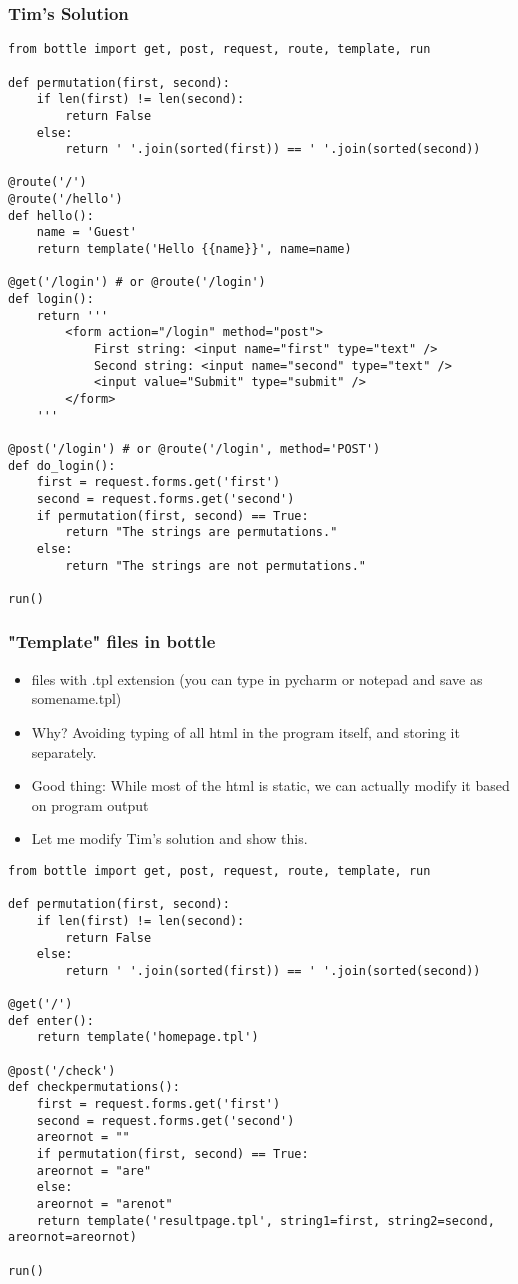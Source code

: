 \documentclass{beamer}
\begin{document}
\begin{frame}[fragile]
\frametitle{Tim's Solution}
\tiny
\begin{verbatim}
from bottle import get, post, request, route, template, run

def permutation(first, second):
    if len(first) != len(second):
        return False
    else:
        return ' '.join(sorted(first)) == ' '.join(sorted(second))

@route('/')
@route('/hello')
def hello():
    name = 'Guest'
    return template('Hello {{name}}', name=name)

@get('/login') # or @route('/login')
def login():
    return '''
        <form action="/login" method="post">
            First string: <input name="first" type="text" />
            Second string: <input name="second" type="text" />
            <input value="Submit" type="submit" />
        </form>
    '''

@post('/login') # or @route('/login', method='POST')
def do_login():
    first = request.forms.get('first')
    second = request.forms.get('second')
    if permutation(first, second) == True:
        return "The strings are permutations."
    else:
        return "The strings are not permutations."

run()
\end{verbatim}
\end{frame}

\begin{frame}[fragile]
\frametitle{"Template" files in bottle}
\begin{itemize}
\item files with .tpl extension (you can type in pycharm or notepad and save as somename.tpl)
\item Why? Avoiding typing of all html in the program itself, and storing it separately. 
\item Good thing: While most of the html is static, we can actually modify it based on program output
\item Let me modify Tim's solution and show this.
\end{itemize}
\end{frame}

\begin{frame}[fragile]
\scriptsize
\begin{verbatim}
from bottle import get, post, request, route, template, run

def permutation(first, second):
    if len(first) != len(second):
        return False
    else:
        return ' '.join(sorted(first)) == ' '.join(sorted(second))

@get('/')
def enter():
    return template('homepage.tpl')

@post('/check')
def checkpermutations():
    first = request.forms.get('first')
    second = request.forms.get('second')
    areornot = ""
    if permutation(first, second) == True:
	areornot = "are"
    else:
	areornot = "arenot"
    return template('resultpage.tpl', string1=first, string2=second, areornot=areornot)

run()
\end{verbatim}
\end{frame}
\end{document}
